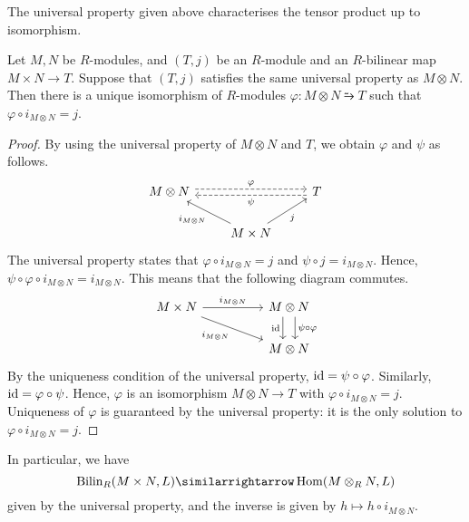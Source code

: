 The universal property given above characterises the tensor product up to isomorphism.
\begin{proposition}
    Let \( M, N \) be \( R \)-modules, and \( (T, j) \) be an \( R \)-module and an \( R \)-bilinear map \( M \times N \to T \).
    Suppose that \( (T, j) \) satisfies the same universal property as \( M \otimes N \).
    Then there is a unique isomorphism of \( R \)-modules \( \varphi : M \otimes N \similarrightarrow T \) such that \( \varphi \circ i_{M \otimes N} = j \).
\end{proposition}
\begin{proof}
    By using the universal property of \( M \otimes N \) and \( T \), we obtain \( \varphi \) and \( \psi \) as follows.
    \[\begin{tikzcd}
        {M \otimes N} && T \\
        & {M \times N}
        \arrow["{i_{M \otimes N}}", from=2-2, to=1-1]
        \arrow["j"', from=2-2, to=1-3]
        \arrow["\varphi", shift left, dashed, from=1-1, to=1-3]
        \arrow["\psi", shift left, dashed, from=1-3, to=1-1]
    \end{tikzcd}\]
    The universal property states that \( \varphi \circ i_{M \otimes N} = j \) and \( \psi \circ j = i_{M \otimes N} \).
    Hence, \( \psi \circ \varphi \circ i_{M \otimes N} = i_{M \otimes N} \).
    This means that the following diagram commutes.
    \[\begin{tikzcd}
        {M \times N} && {M \otimes N} \\
        && {M \otimes N}
        \arrow["{i_{M \otimes N}}", from=1-1, to=1-3]
        \arrow["\id"', shift right=2, from=1-3, to=2-3]
        \arrow["{i_{M \otimes N}}"', from=1-1, to=2-3]
        \arrow["{\psi \circ \varphi}", shift left=2, from=1-3, to=2-3]
    \end{tikzcd}\]
    By the uniqueness condition of the universal property, \( \operatorname{id} = \psi \circ \varphi \).
    Similarly, \( \operatorname{id} = \varphi \circ \psi \).
    Hence, \( \varphi \) is an isomorphism \( M \otimes N \to T \) with \( \varphi \circ i_{M \otimes N} = j \).
    Uniqueness of \( \varphi \) is guaranteed by the universal property: it is the only solution to \( \varphi \circ i_{M \otimes N} = j \).
\end{proof}
In particular, we have
\[ \operatorname{Bilin}_R(M \times N, L) \similarrightarrow \Hom(M \otimes_R N, L) \]
given by the universal property, and the inverse is given by \( h \mapsto h \circ i_{M \otimes N} \).

